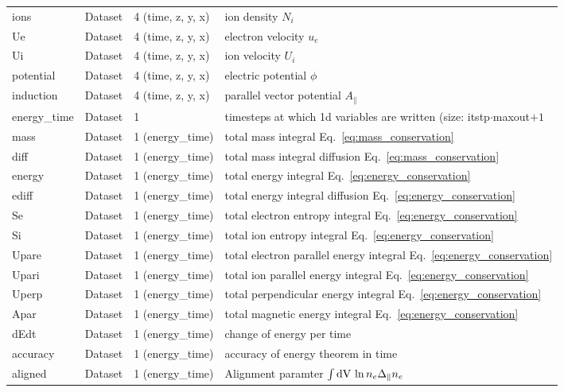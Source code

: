 \begin{longtable}{lll>{\RaggedRight}p{7cm}}
ions             & Dataset & 4 (time, z, y, x) & ion density $N_i$ \\
Ue               & Dataset & 4 (time, z, y, x) & electron velocity $u_e$ \\
Ui               & Dataset & 4 (time, z, y, x) & ion velocity $U_i$ \\
potential        & Dataset & 4 (time, z, y, x) & electric potential $\phi$ \\
induction        & Dataset & 4 (time, z, y, x) & parallel vector potential $A_\parallel$ \\
energy\_time     & Dataset & 1 & timesteps at which 1d variables are written (size: itstp$\cdot$maxout$+1$ \\
mass      & Dataset & 1 (energy\_time) & total mass integral Eq.~\eqref{eq:mass_conservation} \\
diff      & Dataset & 1 (energy\_time) & total mass integral diffusion Eq.~\eqref{eq:mass_conservation} \\
energy    & Dataset & 1 (energy\_time) & total energy integral Eq.~\eqref{eq:energy_conservation} \\
ediff     & Dataset & 1 (energy\_time) & total energy integral diffusion Eq.~\eqref{eq:energy_conservation} \\
Se        & Dataset & 1 (energy\_time) & total electron entropy integral Eq.~\eqref{eq:energy_conservation} \\
Si        & Dataset & 1 (energy\_time) & total ion entropy integral Eq.~\eqref{eq:energy_conservation} \\
Upare        & Dataset & 1 (energy\_time) & total electron parallel energy integral Eq.~\eqref{eq:energy_conservation} \\
Upari        & Dataset & 1 (energy\_time) & total ion parallel energy integral Eq.~\eqref{eq:energy_conservation} \\
Uperp     & Dataset & 1 (energy\_time) & total perpendicular energy integral Eq.~\eqref{eq:energy_conservation} \\
Apar     & Dataset & 1 (energy\_time) & total magnetic energy integral Eq.~\eqref{eq:energy_conservation} \\
dEdt      & Dataset & 1 (energy\_time) & change of energy per time  \\
accuracy  & Dataset & 1 (energy\_time) & accuracy of energy theorem in time  \\
aligned   & Dataset & 1 (energy\_time) & Alignment paramter $\int\mathrm{dV}\, \ln n_e\Delta_\parallel n_e$\\
\bottomrule
\end{longtable}
